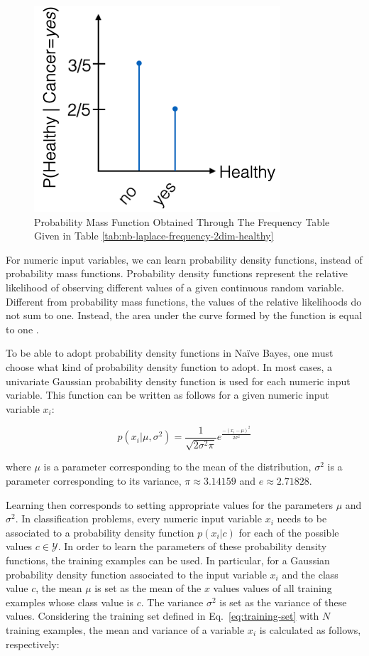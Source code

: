 \begin{figure}[h]
\centering
\includegraphics[scale=0.4]{"figures/nb-mass-function.png"} %
\caption{Probability Mass Function Obtained Through The Frequency Table Given in Table \ref{tab:nb-laplace-frequency-2dim-healthy}}
\end{figure}

For numeric input variables, we can learn probability density functions, instead of probability mass functions. Probability density functions represent the relative likelihood of observing different values of a given continuous random variable. Different from probability mass functions, the values of the relative likelihoods do not sum to one. Instead, the area under the curve formed by the function is equal to one \cite{MathsForML}. 

To be able to adopt probability density functions in Na\"{i}ve Bayes, one must choose what kind of probability density function to adopt. In most cases, a univariate Gaussian probability density function is used for each numeric input variable. This function can be written as follows for a given numeric input variable $x_i$:

\[ p(x_i|\mu,\sigma^2) = \frac{1}{\sqrt{2 \sigma^2 \pi}} e^{\frac{-(x_i - \mu)^2}{2 \sigma^2}}\]

\noindent where $\mu$ is a parameter corresponding to the mean of the distribution, $\sigma^2$ is a parameter corresponding to its variance, $\pi \approx 3.14159$ and $e \approx 2.71828$.

Learning then corresponds to setting appropriate values for the parameters $\mu$ and $\sigma^2$. In classification problems, every numeric input variable $x_i$ needs to be associated to a probability density function $p(x_i|c)$ for each of the possible values $c \in \mathcal{Y}$. In order to learn the parameters of these probability density functions, the training examples can be used. In particular, for a Gaussian probability density function associated to the input variable $x_i$ and the class value $c$, the mean $\mu$ is set as the mean of the $x$ values values of all training examples whose class value is $c$. The variance $\sigma^2$ is set as the variance of these values. Considering the training set defined in Eq.~\ref{eq:training-set} with $N$ training examples, the mean and variance of a variable $x_i$ is calculated as follows, respectively:

